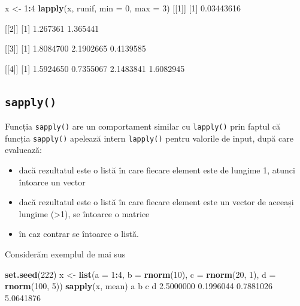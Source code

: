 \documentclass[]{article}
\newenvironment{Shaded}{\begin{snugshade}}{\end{snugshade}}
\newcommand{\KeywordTok}[1]{\textcolor[rgb]{0.13,0.29,0.53}{\textbf{#1}}}
\newcommand{\DataTypeTok}[1]{\textcolor[rgb]{0.13,0.29,0.53}{#1}}
\newcommand{\DecValTok}[1]{\textcolor[rgb]{0.00,0.00,0.81}{#1}}
\newcommand{\FloatTok}[1]{\textcolor[rgb]{0.00,0.00,0.81}{#1}}
\newcommand{\StringTok}[1]{\textcolor[rgb]{0.31,0.60,0.02}{#1}}
\newcommand{\OperatorTok}[1]{\textcolor[rgb]{0.81,0.36,0.00}{\textbf{#1}}}
\newcommand{\NormalTok}[1]{#1}
\begin{document}
\begin{Shaded}
\begin{Highlighting}[]
\NormalTok{x <-}\StringTok{ }\DecValTok{1}\OperatorTok{:}\DecValTok{4}
\KeywordTok{lapply}\NormalTok{(x, runif, }\DataTypeTok{min =} \DecValTok{0}\NormalTok{, }\DataTypeTok{max =} \DecValTok{3}\NormalTok{)}
\NormalTok{[[}\DecValTok{1}\NormalTok{]]}
\NormalTok{[}\DecValTok{1}\NormalTok{] }\FloatTok{0.03443616}

\NormalTok{[[}\DecValTok{2}\NormalTok{]]}
\NormalTok{[}\DecValTok{1}\NormalTok{] }\FloatTok{1.267361} \FloatTok{1.365441}

\NormalTok{[[}\DecValTok{3}\NormalTok{]]}
\NormalTok{[}\DecValTok{1}\NormalTok{] }\FloatTok{1.8084700} \FloatTok{2.1902665} \FloatTok{0.4139585}

\NormalTok{[[}\DecValTok{4}\NormalTok{]]}
\NormalTok{[}\DecValTok{1}\NormalTok{] }\FloatTok{1.5924650} \FloatTok{0.7355067} \FloatTok{2.1483841} \FloatTok{1.6082945}
\end{Highlighting}
\end{Shaded}

\subsection{\texorpdfstring{\texttt{sapply()}}{sapply()}}\label{sapply}

Funcția \texttt{sapply()} are un comportament similar cu
\texttt{lapply()} prin faptul că funcția \texttt{sapply()} apelează
intern \texttt{lapply()} pentru valorile de input, după care evaluează:

\begin{itemize}
\item
  dacă rezultatul este o listă în care fiecare element este de lungime
  1, atunci întoarce un vector
\item
  dacă rezultatul este o listă în care fiecare element este un vector de
  aceeași lungime (\textgreater{}1), se întoarce o matrice
\item
  în caz contrar se întoarce o listă.
\end{itemize}

Considerăm exemplul de mai sus

\begin{Shaded}
\begin{Highlighting}[]
\KeywordTok{set.seed}\NormalTok{(}\DecValTok{222}\NormalTok{)}
\NormalTok{x <-}\StringTok{ }\KeywordTok{list}\NormalTok{(}\DataTypeTok{a =} \DecValTok{1}\OperatorTok{:}\DecValTok{4}\NormalTok{, }\DataTypeTok{b =} \KeywordTok{rnorm}\NormalTok{(}\DecValTok{10}\NormalTok{), }\DataTypeTok{c =} \KeywordTok{rnorm}\NormalTok{(}\DecValTok{20}\NormalTok{, }\DecValTok{1}\NormalTok{), }\DataTypeTok{d =} \KeywordTok{rnorm}\NormalTok{(}\DecValTok{100}\NormalTok{, }\DecValTok{5}\NormalTok{))}
\KeywordTok{sapply}\NormalTok{(x, mean)}
\NormalTok{        a         b         c         d }
\FloatTok{2.5000000} \FloatTok{0.1996044} \FloatTok{0.7881026} \FloatTok{5.0641876} 
\end{Highlighting}
\end{Shaded}
\end{document}

